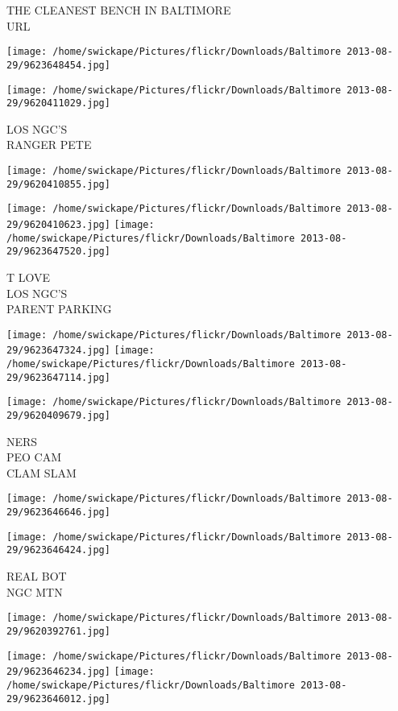 \documentclass[10pt,letterpaper]{article}
\begin{document}
THE CLEANEST BENCH IN BALTIMORE\\
URL
\pagebreak

\texttt{[image: /home/swickape/Pictures/flickr/Downloads/Baltimore 2013-08-29/9623648454.jpg]}

\vspace{0.25in}
\texttt{[image: /home/swickape/Pictures/flickr/Downloads/Baltimore 2013-08-29/9620411029.jpg]}

LOS NGC'S\\
RANGER PETE
\pagebreak

\texttt{[image: /home/swickape/Pictures/flickr/Downloads/Baltimore 2013-08-29/9620410855.jpg]}

\vspace{0.25in}
\texttt{[image: /home/swickape/Pictures/flickr/Downloads/Baltimore 2013-08-29/9620410623.jpg]}
\texttt{[image: /home/swickape/Pictures/flickr/Downloads/Baltimore 2013-08-29/9623647520.jpg]}

T LOVE\\
LOS NGC'S\\
PARENT PARKING
\pagebreak

\texttt{[image: /home/swickape/Pictures/flickr/Downloads/Baltimore 2013-08-29/9623647324.jpg]}
\texttt{[image: /home/swickape/Pictures/flickr/Downloads/Baltimore 2013-08-29/9623647114.jpg]}

\vspace{0.25in}
\texttt{[image: /home/swickape/Pictures/flickr/Downloads/Baltimore 2013-08-29/9620409679.jpg]}

NERS\\
PEO CAM\\
CLAM SLAM
\pagebreak

\texttt{[image: /home/swickape/Pictures/flickr/Downloads/Baltimore 2013-08-29/9623646646.jpg]}

\vspace{0.25in}
\texttt{[image: /home/swickape/Pictures/flickr/Downloads/Baltimore 2013-08-29/9623646424.jpg]}

REAL BOT\\
NGC MTN
\pagebreak

\texttt{[image: /home/swickape/Pictures/flickr/Downloads/Baltimore 2013-08-29/9620392761.jpg]}

\vspace{0.25in}
\texttt{[image: /home/swickape/Pictures/flickr/Downloads/Baltimore 2013-08-29/9623646234.jpg]}
\texttt{[image: /home/swickape/Pictures/flickr/Downloads/Baltimore 2013-08-29/9623646012.jpg]}
\end{document}

